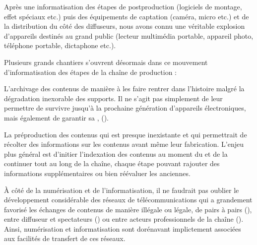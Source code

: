 Après une informatisation des étapes de postproduction (logiciels de montage, effet spéciaux etc.) puis des équipements de captation (caméra, micro etc.) et de la distribution du côté des diffuseurs, nous avons connu une véritable explosion d'appareils destinés au grand public (lecteur multimédia portable, appareil photo, téléphone portable, dictaphone etc.).


Plusieurs grands chantiers s'ouvrent désormais dans ce mouvement d'informatisation des étapes de la chaîne de production :
\begin{liste}
	\item L'archivage des contenus de manière à les faire rentrer dans l'histoire malgré la dégradation inexorable des supports. 
	Il ne s'agit pas simplement de leur permettre de survivre jusqu'à la prochaine génération d'appareils électroniques, mais également de garantir sa , (\cite[p.~12]{Bachimont2000}).

	\item La préproduction des contenus qui est presque inexistante et qui permettrait de récolter des informations sur les contenus avant même leur fabrication. 
	L'enjeu plus général est d'initier l'indexation des contenus au moment du  et de la continuer tout au long de la chaîne, chaque étape pouvant rajouter des informations supplémentaires ou bien réévaluer les anciennes.
\end{liste}

À côté de la numérisation et de l'informatisation, il ne faudrait pas oublier le développement considérable des réseaux de télécommunications qui a grandement favorisé les échanges de contenus de manière illégale ou légale, de pairs à pairs (), entre diffuseur et spectateurs () ou entre acteurs professionnels de la chaîne (). 
Ainsi, numérisation et informatisation sont dorénavant implictement associées aux facilités de transfert de ces réseaux. 

